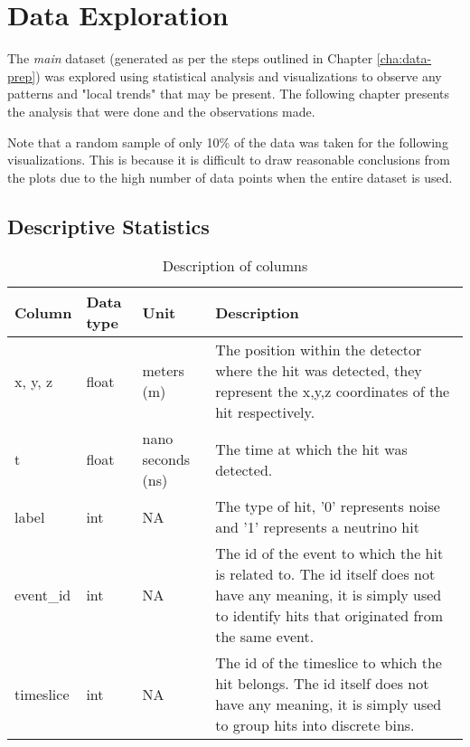 
\chapter{Data Exploration} %
\label{cha:data-exploration}


The \emph{main} dataset (generated as per the steps outlined in Chapter
\ref{cha:data-prep}) was explored using statistical analysis and
visualizations to observe any patterns and "local trends" that may be
present. The following chapter presents the analysis that were done and the
observations made.

Note that a random sample of only 10\% of the data was taken for the following
visualizations. This is because it is difficult to draw reasonable conclusions
from the plots due to the high number of data points when the entire dataset is
used.

\section{Descriptive Statistics}%
\label{sec:data-exp-desc-stats}

\begin{table}[h]
  \centering
  \caption{Description of columns}
  \label{tab:desc-cols}
  \begin{tabular}{p{1.5cm}p{1.5cm}p{2cm}p{8cm}}
    \hline
    Column & Data type & Unit & Description \\
    \hline
    x, y, z & float & meters (m) & The position within the detector where the hit was detected, they represent the x,y,z coordinates of the hit respectively. \\
    t & float & nano seconds (ns) & The time at which the hit was detected. \\
    label & int & NA & The type of hit, '0' represents noise and '1' represents a neutrino hit \\
    event\_id & int & NA & The id of the event to which the hit is related to. The id itself does not have any meaning, it is simply used to identify hits that originated from the same event. \\
    timeslice & int & NA & The id of the timeslice to which the hit belongs. The id itself does not have any meaning, it is simply used to group hits into discrete bins. \\
    \hline
  \end{tabular}
\end{table}

